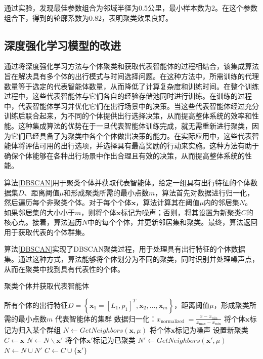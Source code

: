 通过实验，发现最佳参数组合为邻域半径为0.5公里，最小样本数为2。在这个参数组合下，得到的轮廓系数为0.82，表明聚类效果良好。

\subsection{深度强化学习模型的改进}
通过将深度强化学习方法与个体聚类和获取代表智能体的过程相结合，该集成算法旨在解决具有多个体的出行模式与时间选择问题。在这种方法中，所需训练的代理数量等于选定的代表智能体数量，从而降低了计算复杂度和训练时间。在整个训练过程中，这些代表智能体与它们各自的经验存储池同时进行训练。在训练的过程中，代表智能体学习并优化它们在出行场景中的决策。当这些代表智能体经过充分训练后联合起来，为不同的个体提供出行选择决策，从而提高整体系统的效率和性能。这种集成算法的优势在于一旦代表智能体训练完成，就无需重新进行聚类，因为它们已经具备了为聚类中各个个体做出决策的能力。在实际应用中，这些代表智能体将评估可用的出行选项，并选择具有最高奖励的行动来实施。这种方法有助于确保个体能够在各种出行场景中作出合理且有效的决策，从而提高整体系统的性能。

算法\ref{DBSCAN}用于聚类个体并获取代表智能体。给定一组具有出行特征的个体数据集$D$、距离阈值$\mu$和形成聚类所需的最小点数$m$，算法首先对数据进行归一化，然后遍历每个非聚类个体。对于每个个体$\bm{x}$，算法计算其在阈值$\mu$内的邻居集$N$。如果邻居集的大小小于$m$，则将个体$\bm{x}$标记为噪声；否则，将其设置为新聚类$C$的核心点。接着，算法遍历$N$中的每个个体，并更新邻居集和聚类。最终，算法返回用于获取代表的个体群集。

算法\ref{DBSCAN}实现了DBSCAN聚类过程，用于处理具有出行特征的个体数据集。通过这种方式，算法能够将个体划分为不同的聚类，同时识别并处理噪声点，从而在聚类中找到具有代表性的个体。

\begin{algorithm}[H]
\small
\caption{聚类个体并获取代表智能体}\label{DBSCAN}
\begin{algorithmic}
\Require   所有个体的出行特征$D=\left\{\bm{x}_{1}=[L_{1}, p_{1}]^T, \bm{x}_{2}, \ldots, \bm{x}_{m}\right\}$，距离阈值$\mu$，形成聚类所需的最小点数$m$
\Ensure 代表智能体的集群
\State 数据归一化：$x_{\text {normalized }}=\frac{x-x_{\min }}{x_{\max }-x_{\min }}$
    \State 将个体$\bm{x}$标记为归入某个群组
    \State $N \leftarrow GetNeighbors(\bm{x},\mu)$
        \State 将个体$\bm{x}$标记为噪声
    \Else
        \State 设置新聚类$C \leftarrow {\bm{x}}$
            \State $N \leftarrow N \backslash \bm{x'}$
                \State 将个体$\bm{x'}$标记为已聚类
                \State $N' \leftarrow GetNeighbors(\bm{x'},\mu)$
                    \State $N \leftarrow N \cup N'$
                \EndIf
                    \State $C \leftarrow C \cup \{ \bm{x'} \}$
                \EndIf
            \EndIf
        \EndFor
    \EndIf
\EndFor
\end{algorithmic}
\end{algorithm}

